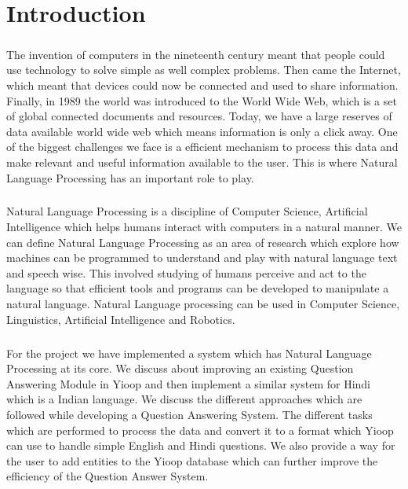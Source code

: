 \chapter{Introduction}

\paragraph{}
The invention of computers in the nineteenth century meant that people could use technology to solve simple as well complex problems. Then came the Internet, which meant that devices could now be connected and used to share information. Finally, in 1989 the world was introduced to the World Wide Web, which is a set of global connected documents and resources. Today, we have a large reserves of data available world wide web which means information is only a click away. One of the biggest challenges we face is a efficient mechanism to process this data and make relevant and useful information available to the user. This is where Natural Language Processing \cite{chowdhury2003natural} has an important role to play.

\paragraph{}
Natural Language Processing is a discipline of Computer Science, Artificial Intelligence which helps humans interact with computers in a natural manner. We can define Natural Language Processing as an area of research which explore how machines can be programmed to understand and play with natural language text and speech wise. This involved studying of humans perceive and act to the language so that efficient tools and programs can be developed to manipulate a natural language. Natural Language processing can be used in Computer Science, Linguistics, Artificial Intelligence and Robotics. 

\paragraph{}
For the project we have implemented a system which has Natural Language Processing at its core. We discuss about improving an existing Question Answering Module in Yioop and then implement a similar system for Hindi which is a Indian language. We discuss the different approaches which are followed while developing a Question Answering System. The different tasks which are performed to process the data and convert it to a format which Yioop can use to handle simple English and Hindi questions. We also provide a way for the user to add entities to the Yioop database which can further improve the efficiency of the Question Answer System.
